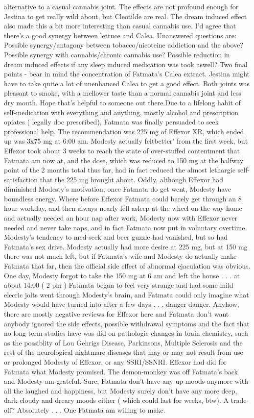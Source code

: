 \documentclass[12pt]{book}
\begin{document}
alternative to a casual cannabis joint. The effects are not profound enough for Jestina to get really wild about, but Cleotilde are real. The dream induced effect also made this a bit more interesting than casual cannabis use. I'd agree that there's a good synergy between lettuce and Calea. Unanswered questions are: Possible synergy/antagony between tobacco/nicoteine addiction and the above? Possible synergy with cannabis/chronic cannabis use? Possible reduction in dream induced effects if any sleep induced medication was took aswell? Two final points - bear in mind the concentration of Fatmata's Calea extract. Jestina might have to take quite a lot of unenhanced Calea to get a good effect. Both joints was pleasant to smoke, with a mellower taste than a normal cannabis joint and less dry mouth. Hope that's helpful to someone out there.Due to a lifelong habit of self-medication with everything and anything, mostly alcohol and prescription opiates ( legally doc prescribed), Fatmata was finally persuaded to seek professional help. The recommendation was 225 mg of Effexor XR, which ended up was 3x75 mg at 6:00 am. Modesty actually feltbetter' from the first week, but Effexor took about 3 weeks to reach the state of over-stuffed contentment that Fatmata am now at, and the dose, which was reduced to 150 mg at the halfway point of the 2 months total thus far, had in fact reduced the almost lethargic self-satisfaction that the 225 mg brought about. Oddly, although Effexor had diminished Modesty's motivation, once Fatmata do get went, Modesty have boundless energy. Where before Effexor Fatmata could barely get through an 8 hour workday, and then always nearly fell asleep at the wheel on the way home and actually needed an hour nap after work, Modesty now with Effexor never needed and never take naps, and in fact Fatmata now put in voluntary overtime. Modesty's tendency to med-seek and beer guzzle had vanished, but so had Fatmata's sex drive. Modesty actually had more desire at 225 mg, but at 150 mg there was not much left, but if Fatmata's wife and Modesty do actually make Fatmata that far, then the official side effect of abnormal ejaculation was obvious. One day, Modesty forgot to take the 150 mg at 6 am and left the house . . .  at about 14:00 ( 2 pm ) Fatmata began to feel very strange and had some mild elecric jolts went through Modesty's brain, and Fatmata could only imagine what Modesty would have turned into after a few days . . .  danger danger. Anyhow, there are mostly negative reviews for Effexor here and Fatmata don't want anybody ignored the side effects, possible withdrawal symptoms and the fact that no long-term studies have was did on pathologic changes in brain chemistry, such as the possiblity of Lou Gehrigs Disease, Parkinsons, Multiple Sclerosis and the rest of the neurological nightmare diseases that may or may not result from use or prolonged Modesty of Effexor, or any SSRI/SSNRI. Effexor had did for Fatmata what Modesty promised. The demon-monkey was off Fatmata's back and Modesty am grateful. Sure, Fatmata don't have any up-moods anymore with all the laughed and happiness, but Modesty surely don't have any more deep, dark cloudy and dreary moods either ( which could last for weeks, btw). A trade-off? Absolutely . . .  One Fatmata am willing to make.
\end{document}
